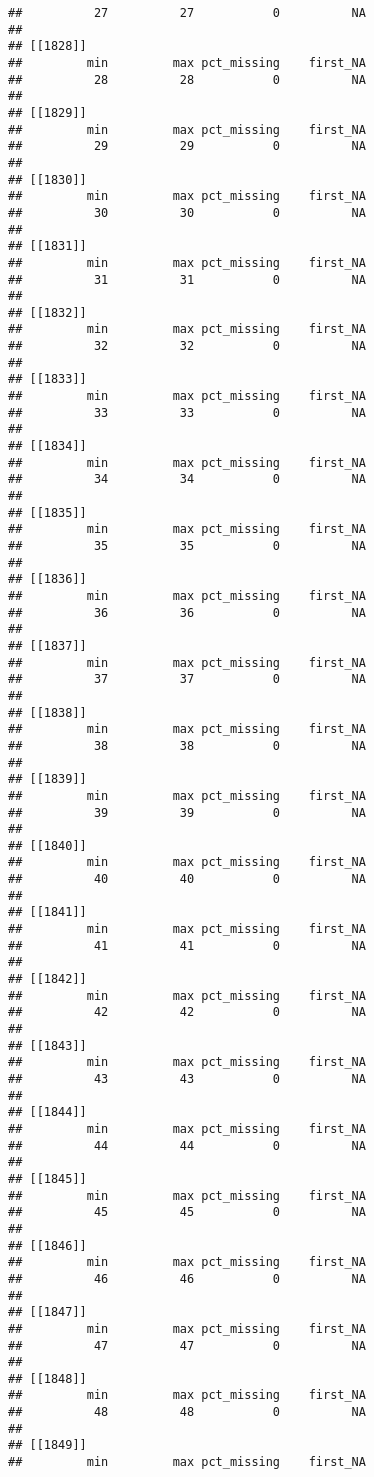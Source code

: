 \documentclass[
]{article}
\begin{document}
\begin{verbatim}
##          27          27           0          NA 
## 
## [[1828]]
##         min         max pct_missing    first_NA 
##          28          28           0          NA 
## 
## [[1829]]
##         min         max pct_missing    first_NA 
##          29          29           0          NA 
## 
## [[1830]]
##         min         max pct_missing    first_NA 
##          30          30           0          NA 
## 
## [[1831]]
##         min         max pct_missing    first_NA 
##          31          31           0          NA 
## 
## [[1832]]
##         min         max pct_missing    first_NA 
##          32          32           0          NA 
## 
## [[1833]]
##         min         max pct_missing    first_NA 
##          33          33           0          NA 
## 
## [[1834]]
##         min         max pct_missing    first_NA 
##          34          34           0          NA 
## 
## [[1835]]
##         min         max pct_missing    first_NA 
##          35          35           0          NA 
## 
## [[1836]]
##         min         max pct_missing    first_NA 
##          36          36           0          NA 
## 
## [[1837]]
##         min         max pct_missing    first_NA 
##          37          37           0          NA 
## 
## [[1838]]
##         min         max pct_missing    first_NA 
##          38          38           0          NA 
## 
## [[1839]]
##         min         max pct_missing    first_NA 
##          39          39           0          NA 
## 
## [[1840]]
##         min         max pct_missing    first_NA 
##          40          40           0          NA 
## 
## [[1841]]
##         min         max pct_missing    first_NA 
##          41          41           0          NA 
## 
## [[1842]]
##         min         max pct_missing    first_NA 
##          42          42           0          NA 
## 
## [[1843]]
##         min         max pct_missing    first_NA 
##          43          43           0          NA 
## 
## [[1844]]
##         min         max pct_missing    first_NA 
##          44          44           0          NA 
## 
## [[1845]]
##         min         max pct_missing    first_NA 
##          45          45           0          NA 
## 
## [[1846]]
##         min         max pct_missing    first_NA 
##          46          46           0          NA 
## 
## [[1847]]
##         min         max pct_missing    first_NA 
##          47          47           0          NA 
## 
## [[1848]]
##         min         max pct_missing    first_NA 
##          48          48           0          NA 
## 
## [[1849]]
##         min         max pct_missing    first_NA 

\end{verbatim}
\end{document}
